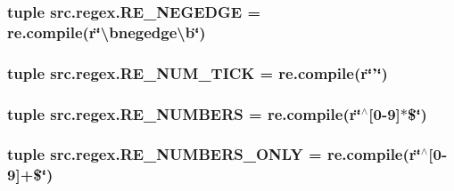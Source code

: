\hypertarget{namespacesrc_1_1regex_a4057131e7a4dcaa11c36bd0013fdec6d}{
\subsubsection[{R\-E\-\_\-\-N\-E\-G\-E\-D\-G\-E}]{\setlength{\rightskip}{0pt plus 5cm}tuple src.\-regex.\-R\-E\-\_\-\-N\-E\-G\-E\-D\-G\-E = re.\-compile(r\char`\"{}\textbackslash{}bnegedge\textbackslash{}b\char`\"{})}}\label{namespacesrc_1_1regex_a4057131e7a4dcaa11c36bd0013fdec6d}
\hypertarget{namespacesrc_1_1regex_a7ff7ef8dfc5c6b803b01510174721810}{
\subsubsection[{R\-E\-\_\-\-N\-U\-M\-\_\-\-T\-I\-C\-K}]{\setlength{\rightskip}{0pt plus 5cm}tuple src.\-regex.\-R\-E\-\_\-\-N\-U\-M\-\_\-\-T\-I\-C\-K = re.\-compile(r\char`\"{}'\char`\"{})}}\label{namespacesrc_1_1regex_a7ff7ef8dfc5c6b803b01510174721810}
\hypertarget{namespacesrc_1_1regex_a608949493486b4ae20640a12a55888c4}{
\subsubsection[{R\-E\-\_\-\-N\-U\-M\-B\-E\-R\-S}]{\setlength{\rightskip}{0pt plus 5cm}tuple src.\-regex.\-R\-E\-\_\-\-N\-U\-M\-B\-E\-R\-S = re.\-compile(r\char`\"{}$^\wedge$\mbox{[}0-\/9\mbox{]}$\ast$\$\char`\"{})}}\label{namespacesrc_1_1regex_a608949493486b4ae20640a12a55888c4}
\hypertarget{namespacesrc_1_1regex_add225ad490cc0f47df2f4fc81f1ad66a}{
\subsubsection[{R\-E\-\_\-\-N\-U\-M\-B\-E\-R\-S\-\_\-\-O\-N\-L\-Y}]{\setlength{\rightskip}{0pt plus 5cm}tuple src.\-regex.\-R\-E\-\_\-\-N\-U\-M\-B\-E\-R\-S\-\_\-\-O\-N\-L\-Y = re.\-compile(r\char`\"{}$^\wedge$\mbox{[}0-\/9\mbox{]}+\$\char`\"{})}}\label{namespacesrc_1_1regex_add225ad490cc0f47df2f4fc81f1ad66a}
